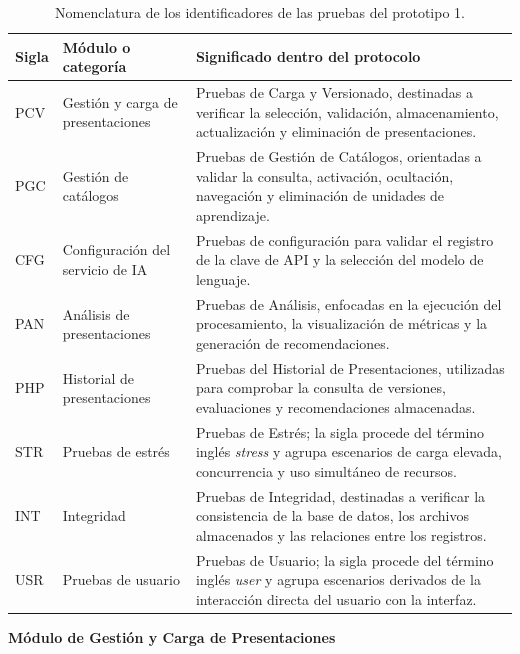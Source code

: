 \documentclass[11pt]{article}
\begin{document}
\begin{table}[H]
    \centering
    \renewcommand{\arraystretch}{1.2}
    \begin{tabularx}{\textwidth}{|>{\centering\arraybackslash}p{1.5cm}|p{4.6cm}|X|}
        \hline
        \textbf{Sigla} & \textbf{Módulo o categoría} & \textbf{Significado dentro del protocolo} \\
        \hline
        PCV & Gestión y carga de presentaciones & Pruebas de Carga y Versionado, destinadas a verificar la selección, validación, almacenamiento, actualización y eliminación de presentaciones. \\
        \hline
        PGC & Gestión de catálogos & Pruebas de Gestión de Catálogos, orientadas a validar la consulta, activación, ocultación, navegación y eliminación de unidades de aprendizaje. \\
        \hline
        CFG & Configuración del servicio de IA & Pruebas de configuración para validar el registro de la clave de API y la selección del modelo de lenguaje. \\
        \hline
        PAN & Análisis de presentaciones & Pruebas de Análisis, enfocadas en la ejecución del procesamiento, la visualización de métricas y la generación de recomendaciones. \\
        \hline
        PHP & Historial de presentaciones & Pruebas del Historial de Presentaciones, utilizadas para comprobar la consulta de versiones, evaluaciones y recomendaciones almacenadas. \\
        \hline
        STR & Pruebas de estrés & Pruebas de Estrés; la sigla procede del término inglés \textit{stress} y agrupa escenarios de carga elevada, concurrencia y uso simultáneo de recursos. \\
        \hline
        INT & Integridad & Pruebas de Integridad, destinadas a verificar la consistencia de la base de datos, los archivos almacenados y las relaciones entre los registros. \\
        \hline
        USR & Pruebas de usuario & Pruebas de Usuario; la sigla procede del término inglés \textit{user} y agrupa escenarios derivados de la interacción directa del usuario con la interfaz. \\
        \hline
    \end{tabularx}
    \caption{Nomenclatura de los identificadores de las pruebas del prototipo 1.}
    \label{tab:nomenclatura-pruebas-prototipo-1}
\end{table}

\textbf{Módulo de Gestión y Carga de Presentaciones}
\end{document}
